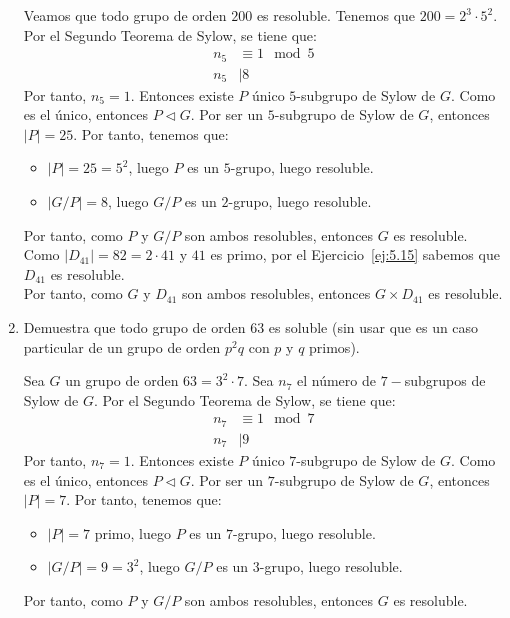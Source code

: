 \begin{ejercicio}
\begin{enumerate}
        Veamos que todo grupo de orden $200$ es resoluble. Tenemos que $200=2^3\cdot 5^2$. Por el Segundo Teorema de Sylow, se tiene que:
        \begin{align*}
            n_5 &\equiv 1 \mod 5 \\
            n_5 &\mid 8
        \end{align*}
        Por tanto, $n_5=1$. Entonces existe $P$ único $5$-subgrupo de Sylow de $G$. Como es el único, entonces $P\lhd G$. Por ser un $5$-subgrupo de Sylow de $G$, entonces $|P|=25$. Por tanto, tenemos que:
        \begin{itemize}
            \item $|P|=25=5^2$, luego $P$ es un $5$-grupo, luego resoluble.
            \item $|G/P|=8$, luego $G/P$ es un $2$-grupo, luego resoluble.
        \end{itemize}
        Por tanto, como $P$ y $G/P$ son ambos resolubles, entonces $G$ es resoluble.\\

        Como $|D_{41}|=82=2\cdot 41$ y $41$ es primo, por el Ejercicio~\ref{ej:5.15} sabemos que $D_{41}$ es resoluble.\\

        Por tanto, como $G$ y $D_{41}$ son ambos resolubles, entonces $G\times D_{41}$ es resoluble.
        \item Demuestra que todo grupo de orden $63$ es soluble (sin usar que es un caso particular de un grupo de orden $p^2q$ con $p$ y $q$ primos).
        
        Sea $G$ un grupo de orden $63=3^2\cdot 7$. Sea $n_7$ el número de $7-$subgrupos de Sylow de $G$. Por el Segundo Teorema de Sylow, se tiene que:
        \begin{align*}
            n_7 &\equiv 1 \mod 7 \\
            n_7 &\mid 9
        \end{align*}
        Por tanto, $n_7=1$. Entonces existe $P$ único $7$-subgrupo de Sylow de $G$. Como es el único, entonces $P\lhd G$. Por ser un $7$-subgrupo de Sylow de $G$, entonces $|P|=7$. Por tanto, tenemos que:
        \begin{itemize}
            \item $|P|=7$ primo, luego $P$ es un $7$-grupo, luego resoluble.
            \item $|G/P|=9=3^2$, luego $G/P$ es un $3$-grupo, luego resoluble.
        \end{itemize}
        Por tanto, como $P$ y $G/P$ son ambos resolubles, entonces $G$ es resoluble.
    \end{enumerate}
\end{ejercicio}